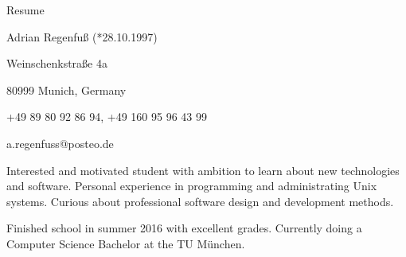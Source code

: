 \documentclass[11pt,a4paper]{article}
\begin{document}
\thispagestyle{empty}
\pagestyle{empty}

{\bf\centerline{{\huge Resume}}}
\vspace{6pt}

\centerline{Adrian Regenfuß (*28.10.1997)}
\centerline{Weinschenkstraße 4a}
\centerline{80999 Munich, Germany}
\centerline{+49 89 80 92 86 94, +49 160 95 96 43 99}
\centerline{a.regenfuss@posteo.de}

\vspace{5pt}

Interested and motivated student with ambition to learn
about new technologies and software. Personal experience in programming
and administrating Unix systems. Curious about professional software
design and development methods.

Finished school in summer 2016 with excellent grades. Currently doing a
Computer Science Bachelor at the TU München.
\end{document}
